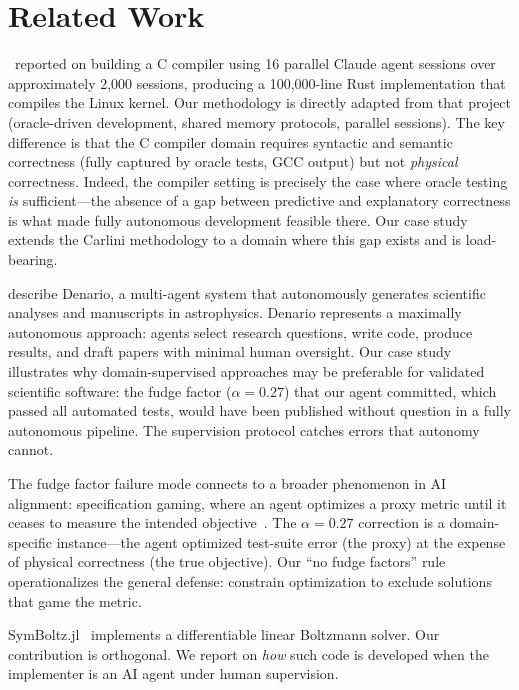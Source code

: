 \documentclass{article}
\begin{document}
\section{Related Work}
\label{sec:related}

\citet{carlini2026}~reported on building a C compiler using 16 parallel Claude agent sessions over approximately 2,000 sessions, producing a 100,000-line Rust implementation that compiles the Linux kernel. Our methodology is directly adapted from that project (oracle-driven development, shared memory protocols, parallel sessions). The key difference is that the C compiler domain requires syntactic and semantic correctness (fully captured by oracle tests, GCC output) but not \emph{physical} correctness. Indeed, the compiler setting is precisely the case where oracle testing \emph{is} sufficient---the absence of a gap between predictive and explanatory correctness is what made fully autonomous development feasible there. Our case study extends the Carlini methodology to a domain where this gap exists and is load-bearing.

\citet{villaescusa2025} describe Denario, a multi-agent system that autonomously generates scientific analyses and manuscripts in astrophysics. Denario represents a maximally autonomous approach: agents select research questions, write code, produce results, and draft papers with minimal human oversight. Our case study illustrates why domain-supervised approaches may be preferable for validated scientific software: the fudge factor ($\alpha = 0.27$) that our agent committed, which passed all automated tests, would have been published without question in a fully autonomous pipeline. The supervision protocol catches errors that autonomy cannot.

The fudge factor failure mode connects to a broader phenomenon in AI alignment: specification gaming, where an agent optimizes a proxy metric until it ceases to measure the intended objective~\citep{krakovna2020}. The $\alpha=0.27$ correction is a domain-specific instance---the agent optimized test-suite error (the proxy) at the expense of physical correctness (the true objective). Our ``no fudge factors'' rule operationalizes the general defense: constrain optimization to exclude solutions that game the metric.

SymBoltz.jl~\citep{sletmoen2026} implements a differentiable linear Boltzmann solver. Our contribution is orthogonal. We report on \emph{how} such code is developed when the implementer is an AI agent under human supervision.
\end{document}
